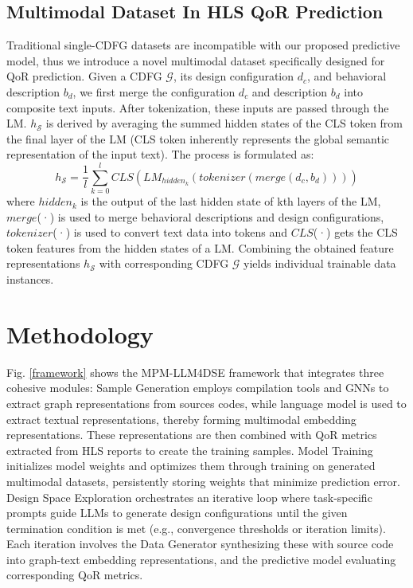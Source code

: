\documentclass[conference]{IEEEtran}
\begin{document}
\subsection{Multimodal Dataset In HLS QoR Prediction}
    Traditional single-CDFG datasets are incompatible with our proposed predictive model, thus we introduce a novel multimodal dataset specifically designed for QoR prediction. Given a CDFG $\mathcal{G}$, its design configuration $d_{c}$, and behavioral description $b_{d}$, we first merge the configuration $d_{c}$ and description $b_{d}$ into composite text inputs. After tokenization, these inputs are passed through the LM. $h_{\mathcal{S}}$ is derived by averaging the summed hidden states of the CLS token from the final layer of the LM (CLS token inherently represents the global semantic representation of the input text). The process is formulated as:
	\begin{equation}\label{eq3}
		h_{\mathcal{S}} = \frac{1}{l} \sum_{k=0}^{l} CLS(LM_{hidden_{k}}(tokenizer\left( merge\left( d_{c}, b_{d} \right) \right) ))
	\end{equation}
    where $hidden_{k}$ is the output of the last hidden state of kth layers of the LM, $merge$(·)  is used to merge behavioral descriptions and design configurations, $tokenizer$(·) is used to convert text data into tokens and $CLS$(·) gets the CLS token features from the hidden states of a LM. Combining the obtained feature representations $h_{\mathcal{S}}$ with corresponding CDFG $\mathcal{G}$ yields individual trainable data instances.
	
\section{Methodology}	
	Fig. \ref{framework} shows the MPM-LLM4DSE framework that integrates three cohesive modules: Sample Generation employs compilation tools and GNNs to extract graph representations from sources codes, while language model is used to extract textual representations, thereby forming multimodal embedding representations. These representations are then combined with QoR metrics extracted from HLS reports to create the training samples. Model Training initializes model weights and optimizes them through training on generated multimodal datasets, persistently storing weights that minimize prediction error. Design Space Exploration orchestrates an iterative loop where task-specific prompts guide LLMs to generate design configurations until the given termination condition is met (e.g., convergence thresholds or iteration limits). Each iteration involves the Data Generator synthesizing these with source code into graph-text embedding representations, and the predictive model evaluating corresponding QoR metrics.
\end{document}
